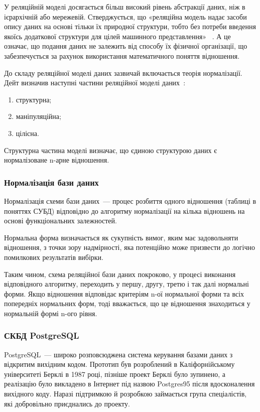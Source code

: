 У реляційній моделі досягається більш високий рівень абстракції даних, ніж в ієрархічній або мережевій. Стверджується, що «реляційна модель надає засоби опису даних на основі тільки їх природної структури, тобто без потреби введення якоїсь додаткової структури для цілей машинного представлення»~ \cite{codd1970relational}. А це означає, що подання даних не залежить від способу їх фізичної організації, що забезпечується за рахунок використання математичного поняття відношення.

До складу реляційної моделі даних зазвичай включається теорія нормалізації. Дейт визначив наступні частини реляційної моделі даних~\cite{дейт2008введение}:
\begin{enumerate}
	\item структурна;
	\item маніпуляційна;
	\item цілісна.
\end{enumerate}

Структурна частина моделі визначає, що єдиною структурою даних є нормалізоване n-арне відношення.


\subsubsection{Нормалізація бази даних}

Нормалізація схеми бази даних~--- процес розбиття одного відношення (таблиці в поняттях СУБД) відповідно до алгоритму нормалізації на кілька відношень на основі функціональних залежностей.

Нормальна форма визначається як сукупність вимог, яким має задовольняти відношення, з точки зору надмірності, яка потенційно може призвести до логічно помилкових результатів вибірки.

Таким чином, схема реляційної бази даних покроково, у процесі виконання відповідного алгоритму, переходить у першу, другу, третю і так далі нормальні форми. Якщо відношення відповідає критеріям n-ої нормальної форми та всіх попередніх нормальних форм, тоді вважається, що це відношення знаходиться у нормальній формі n-ого рівня.

\subsubsection{СКБД PostgreSQL}

PostgreSQL~--- широко розповсюджена система керування базами даних з відкритим вихідним кодом. Прототип був розроблений в Каліфорнійському університеті Берклі в 1987 році, пізніше проект Берклі було зупинено, а реалізацію було викладено в Інтернет під назвою Postgres95 після вдосконалення вихідного коду. Наразі підтримкою й розробкою займається група спеціалістів, які добровільно приєднались до проекту.

